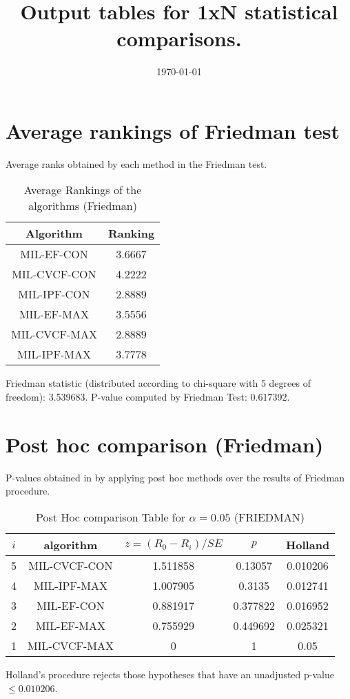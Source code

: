 \documentclass[a4paper,10pt]{article}
\title{Output tables for 1xN statistical comparisons.}
\author{}
\date{\today}
\begin{document}
\begin{landscape}
\pagestyle{empty}
\maketitle
\thispagestyle{empty}

\section{Average rankings of Friedman test}


Average ranks obtained by each method in the Friedman test.

\begin{table}[!htp]
\centering
\begin{tabular}{|c|c|}\hline
Algorithm&Ranking\\\hline
MIL-EF-CON&3.6667\\MIL-CVCF-CON&4.2222\\MIL-IPF-CON&2.8889\\MIL-EF-MAX&3.5556\\MIL-CVCF-MAX&2.8889\\MIL-IPF-MAX&3.7778\\\hline\end{tabular}
\caption{Average Rankings of the algorithms (Friedman)}
\end{table}

Friedman statistic (distributed according to chi-square with 5 degrees of freedom): 3.539683. \newline P-value computed by Friedman Test: 0.617392.\newline


\newpage

\section{Post hoc comparison (Friedman)}


P-values obtained in by applying post hoc methods over the results of Friedman procedure.

\begin{table}[!htp]
\centering\footnotesize
\begin{tabular}{ccccc}
$i$&algorithm&$z=(R_0 - R_i)/SE$&$p$&Holland\\
\hline5&MIL-CVCF-CON&1.511858&0.13057&0.010206\\4&MIL-IPF-MAX&1.007905&0.3135&0.012741\\3&MIL-EF-CON&0.881917&0.377822&0.016952\\2&MIL-EF-MAX&0.755929&0.449692&0.025321\\1&MIL-CVCF-MAX&0&1&0.05\\\hline
\end{tabular}
\caption{Post Hoc comparison Table for $\alpha=0.05$ (FRIEDMAN)}
\end{table}Holland's procedure rejects those hypotheses that have an unadjusted p-value $\le0.010206$.



\end{landscape}
\end{document}
